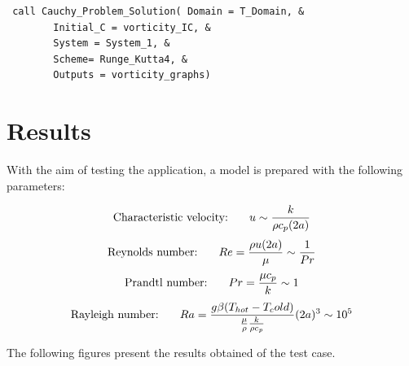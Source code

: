 \begin{blueframed}
\begin{lstlisting}
 call Cauchy_Problem_Solution( Domain = T_Domain, &
 		Initial_C = vorticity_IC, &
		System = System_1, &
		Scheme= Runge_Kutta4, &
		Outputs = vorticity_graphs)
\end{lstlisting}
\end{blueframed}

\newpage

\section{Results}

With the aim of testing the application, a model is prepared with the following
parameters:

$$\text{Characteristic velocity:   }\hspace{0.5cm} u\sim \frac{k}{\rho c_p
(2a)}$$ $$\text{Reynolds number:   }\hspace{0.5cm} Re= \frac{\rho u (2a)}{\mu} \sim
\frac{1}{Pr}
$$
$$\text{Prandtl number:   }\hspace{0.5cm} Pr= \frac{\mu c_p }{k} \sim 1
$$
$$\text{Rayleigh number:   }\hspace{0.5cm} Ra= \frac{g \beta
(T_{hot}-T_cold)}{\frac{\mu}{\rho} \frac{k}{\rho c_p}} (2a)^3 \sim 10^5 $$


The following figures present the results obtained of the test case.


